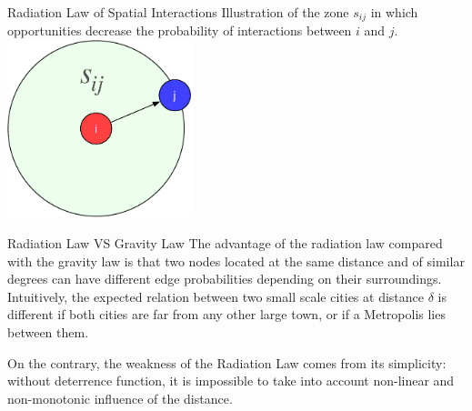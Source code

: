 \documentclass[a4paper,11pt]{book}
\begin{document}
\begin{textbox}{Radiation Law of Spatial Interactions}
Illustration of the zone $s_{ij}$ in which opportunities decrease the probability of interactions between $i$ and $j$.
\centering
\includegraphics[width=0.4\textwidth]{pics/radiation.pdf}

\end{textbox}



\begin{textbox}{Radiation Law VS Gravity Law}
The advantage of the radiation law compared with the gravity law is that two nodes located at the same distance and of similar degrees can have different edge probabilities depending on their surroundings. Intuitively, the expected relation between two small scale cities at distance $\delta$ is different if both cities are far from any other large town, or if a Metropolis lies between them. 

On the contrary, the weakness of the Radiation Law comes from its simplicity: without deterrence function, it is impossible to take into account non-linear and non-monotonic influence of the distance.
\end{textbox}
\end{document}
